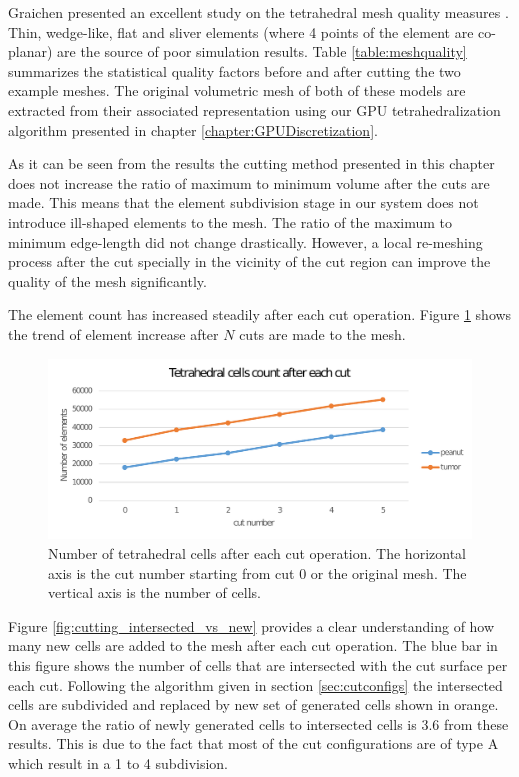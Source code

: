 Graichen \etal presented an excellent study on the tetrahedral mesh quality measures \cite{Graichen1993}. 
Thin, wedge-like, flat and sliver elements (where 4 points of the element are co-planar) are the source of poor simulation 
results. Table \ref{table:meshquality} summarizes the statistical quality factors before and after cutting the two example meshes. 
The original volumetric mesh of both of these models are extracted from their associated \blob representation using our GPU tetrahedralization
algorithm presented in chapter \ref{chapter:GPUDiscretization}.

As it can be seen from the results the cutting method presented in this chapter does not increase the ratio of maximum to minimum 
volume after the cuts are made. This means that the element subdivision stage in our system does not 
introduce ill-shaped elements to the mesh. The ratio of the maximum to minimum edge-length did not change drastically.
However, a local re-meshing process after the cut specially in the vicinity of the cut region can improve the quality 
of the mesh significantly. 

The element count has increased steadily after each cut operation. Figure \ref{fig:cutting_cells_increase} shows the trend of element increase 
after $N$ cuts are made to the mesh.

\begin{figure}[H]
  \centering
  \includegraphics[width=1.0\linewidth]{figures/cutting/cutting_cells_increase.pdf}
  \caption{\label{fig:cutting_cells_increase}
  {Number of tetrahedral cells after each cut operation. The horizontal axis is the cut number starting from cut 0 or the original mesh. 
  The vertical axis is the number of cells.}
}
\end{figure}

Figure \ref{fig:cutting_intersected_vs_new} provides a clear understanding of how many new cells are added to the mesh after each cut operation.
The blue bar in this figure shows the number of cells that are intersected with the cut surface per each cut. Following the algorithm given in 
section \ref{sec:cutconfigs} the intersected cells are subdivided and replaced by new set of generated cells shown in orange. 
On average the ratio of newly generated cells to intersected cells is 3.6 from these results. This is due to the fact that most of the cut configurations
are of type A which result in a 1 to 4 subdivision. 

